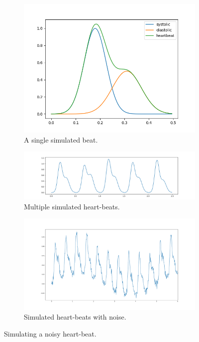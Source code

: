 \documentclass[12pt,a4paper,twoside,openright]{report}
\begin{document}
\begin{figure}
	\centering
	\begin{subfigure}[b]{0.4\textwidth}
		\centerline{\includegraphics[width=\textwidth]{figs/sim-beat.png}}
		\caption{A single simulated beat.}
		\label{fig:sim-beat}
	\end{subfigure}
	\hfill
	\begin{subfigure}[b]{0.5\textwidth}
		\centerline{\includegraphics[width=\textwidth]{figs/sim-beats.png}}
		\caption{Multiple simulated heart-beats.}
		\label{fig:sim-beats}
	\end{subfigure}
	\hfill
	\begin{subfigure}[b]{0.6\textwidth}
		\centerline{\includegraphics[width=\textwidth]{figs/sim-beats-with-noise.png}}
		\caption{Simulated heart-beats with noise.}
		\label{fig:sim-beats-noise}
	\end{subfigure}
	\caption{Simulating a noisy heart-beat.}
\end{figure}
\end{document}
